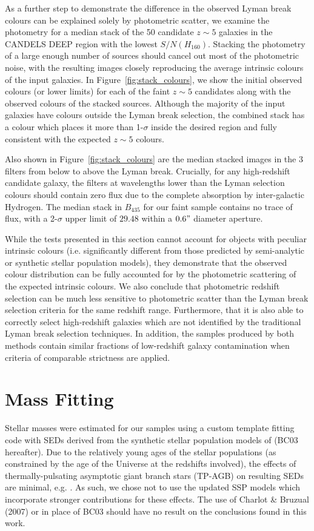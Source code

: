 As a further step to demonstrate the difference in the observed Lyman break colours can be explained solely by photometric scatter, we examine the photometry for a median stack of the 50 candidate $z \sim 5$ galaxies in the CANDELS DEEP region with the lowest $S/N(H_{160})$. Stacking the photometry of a large enough number of sources should cancel out most of the photometric noise, with the resulting images closely reproducing the average intrinsic colours of the input galaxies. In Figure~\ref{fig:stack_colours}, we show the initial observed colours (or lower limits) for each of the faint $z\sim5$ candidates along with the observed colours of the stacked sources. Although the majority of the input galaxies have colours outside the Lyman break selection, the combined stack has a colour which places it more than 1-$\sigma$ inside the desired region and fully consistent with the expected $z \sim 5$ colours.

Also shown in Figure~\ref{fig:stack_colours} are the median stacked images in the 3 filters from below to above the Lyman break. Crucially, for any high-redshift candidate galaxy, the filters at wavelengths lower than the Lyman selection colours should contain zero flux due to the complete absorption by inter-galactic Hydrogen. The median stack in $B_{435}$ for our faint sample contains no trace of flux, with a 2-$\sigma$ upper limit of $29.48$ within a $0.6"$ diameter aperture.

While the tests presented in this section cannot account for objects with peculiar intrinsic colours (i.e. significantly different from those predicted by semi-analytic or synthetic stellar population models), they demonstrate that the observed colour distribution can be fully accounted for by the photometric scattering of the expected intrinsic colours. We also conclude that photometric redshift selection can be much less sensitive to photometric scatter than the Lyman break selection criteria for the same redshift range. Furthermore, that it is also able to correctly select high-redshift galaxies which are not identified by the traditional Lyman break selection techniques. In addition, the samples produced by both methods contain similar fractions of low-redshift galaxy contamination when criteria of comparable strictness are applied.


\section{Mass Fitting}\label{sec:masses}
Stellar masses were estimated for our samples using a custom template fitting code with SEDs derived from the synthetic stellar population models of \citet{Bruzual:2003ckb} (BC03 hereafter). Due to the relatively young ages of the stellar populations (as constrained by the age of the Universe at the redshifts involved), the effects of thermally-pulsating asymptotic giant branch stars (TP-AGB) on resulting SEDs are minimal, e.g. \citet{2009ApJ...697.1493S}. As such, we chose not to use the updated SSP models which incorporate stronger contributions for these effects. The use of Charlot \& Bruzual (2007) or \citet{Maraston:2005er} in place of BC03 should have no result on the conclusions found in this work.

